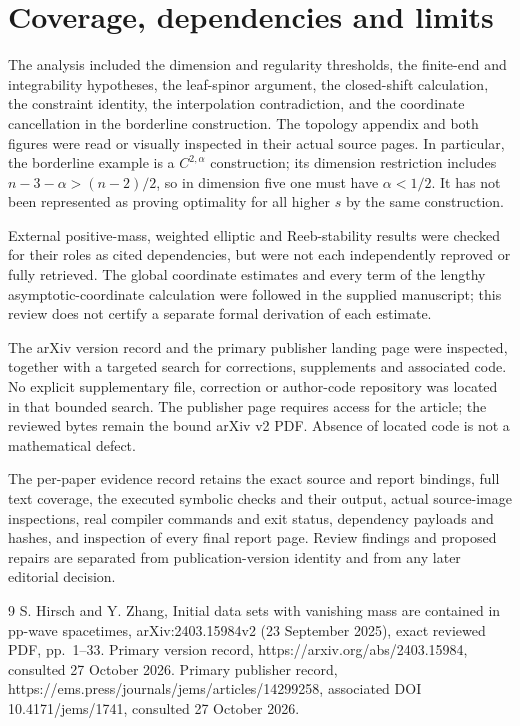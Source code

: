 \documentclass[10pt]{article}
\begin{document}
\section*{Coverage, dependencies and limits}
The analysis included the dimension and regularity thresholds, the finite-end and integrability hypotheses, the leaf-spinor argument, the closed-shift calculation, the constraint identity, the interpolation contradiction, and the coordinate cancellation in the borderline construction. The topology appendix and both figures were read or visually inspected in their actual source pages. In particular, the borderline example is a \(C^{2,\alpha}\) construction; its dimension restriction includes \(n-3-\alpha>(n-2)/2\), so in dimension five one must have \(\alpha<1/2\). It has not been represented as proving optimality for all higher \(s\) by the same construction.\par
External positive-mass, weighted elliptic and Reeb-stability results were checked for their roles as cited dependencies, but were not each independently reproved or fully retrieved. The global coordinate estimates and every term of the lengthy asymptotic-coordinate calculation were followed in the supplied manuscript; this review does not certify a separate formal derivation of each estimate.\par
The arXiv version record and the primary publisher landing page were inspected, together with a targeted search for corrections, supplements and associated code. No explicit supplementary file, correction or author-code repository was located in that bounded search. The publisher page requires access for the article; the reviewed bytes remain the bound arXiv v2 PDF. Absence of located code is not a mathematical defect.\par
The per-paper evidence record retains the exact source and report bindings, full text coverage, the executed symbolic checks and their output, actual source-image inspections, real compiler commands and exit status, dependency payloads and hashes, and inspection of every final report page. Review findings and proposed repairs are separated from publication-version identity and from any later editorial decision.\par
9 S. Hirsch and Y. Zhang, Initial data sets with vanishing mass are contained in pp-wave spacetimes, arXiv:2403.15984v2 (23 September 2025), exact reviewed PDF, pp. 1–33. Primary version record, https://arxiv.org/abs/2403.15984, consulted 27 October 2026. Primary publisher record, https://ems.press/journals/jems/articles/14299258, associated DOI 10.4171/jems/1741, consulted 27 October 2026.\par
\end{document}

